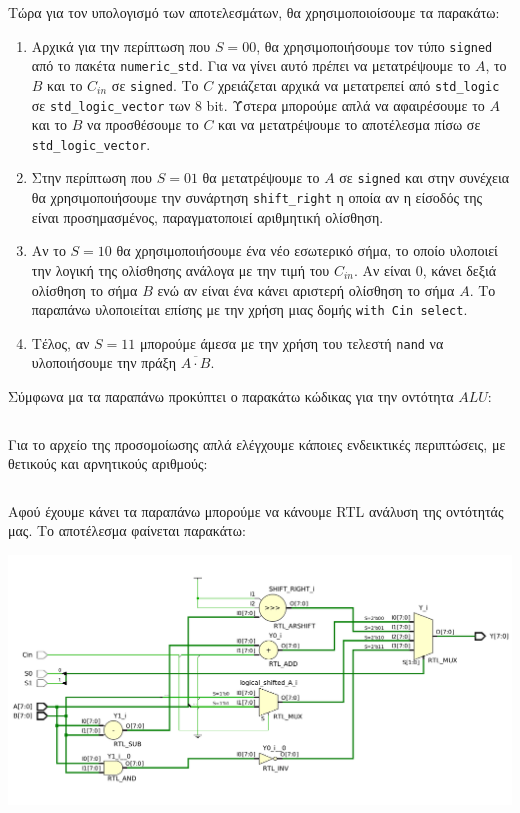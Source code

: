 \documentclass[11pt, a4paper]{report}
\begin{document}
Τώρα για τον υπολογισμό των αποτελεσμάτων, θα χρησιμοποιοίσουμε τα παρακάτω:
\begin{enumerate}
	\item Αρχικά για την περίπτωση που $S = 00$, θα χρησιμοποιήσουμε τον τύπο \texttt{signed} από το πακέτα \texttt{numeric_std}.
	      Για να γίνει αυτό πρέπει να μετατρέψουμε το $A$, το $B$ και το $C_{in}$ σε \texttt{signed}.
	      Το $C$ χρειάζεται αρχικά να μετατρεπεί από \texttt{std_logic} σε \texttt{std_logic_vector} των 8 bit.
	      Ύστερα μπορούμε απλά να αφαιρέσουμε το $A$ και το $B$ να προσθέσουμε το $C$ και να μετατρέψουμε το αποτέλεσμα πίσω σε \texttt{std_logic_vector}.
	\item Στην περίπτωση που $S = 01$ θα μετατρέψουμε το $Α$ σε \texttt{signed} και στην συνέχεια θα χρησιμοποιήσουμε την συνάρτηση
	      \texttt{shift_right} η οποία αν η είσοδός της είναι προσημασμένος, παραγματοποιεί αριθμητική ολίσθηση.
	\item Αν το $S = 10$ θα χρησιμοποιήσουμε ένα νέο εσωτερικό σήμα, το οποίο υλοποιεί την λογική της ολίσθησης ανάλογα με την τιμή του $C_{in}$.
	      Αν είναι 0, κάνει δεξιά ολίσθηση το σήμα $B$ ενώ αν είναι ένα κάνει αριστερή ολίσθηση το σήμα $Α$. Το παραπάνω υλοποιείται επίσης με την χρήση μιας δομής \texttt{with Cin select}.
	\item Τέλος, αν $S = 11$ μπορούμε άμεσα με την χρήση του τελεστή \texttt{nand} να υλοποιήσουμε την πράξη $\overline{A \cdot B}$.
\end{enumerate}

Σύμφωνα μα τα παραπάνω προκύπτει ο παρακάτω κώδικας για την οντότητα $ALU$:
\inputminted[breaklines, linenos]{vhdl}{./code/part-2/alu-1/alu.vhdl}

Για το αρχείο της προσομοίωσης απλά ελέγχουμε κάποιες ενδεικτικές περιπτώσεις, με θετικούς και αρνητικούς αριθμούς:
\inputminted[breaklines, linenos]{vhdl}{./code/part-2/alu-1/alu_tb.vhdl}

\newpage
 
Αφού έχουμε κάνει τα παραπάνω μπορούμε να κάνουμε RTL ανάλυση της οντότητάς μας. Το αποτέλεσμα φαίνεται παρακάτω:
\begin{center}
	\includegraphics[width=\textwidth]{./images/alu-1/Joe_RLT_ALU.png}
\end{center}
\end{document}
